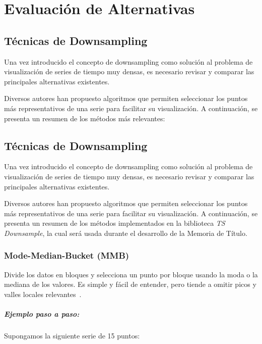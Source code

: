 \chapter{Evaluación de Alternativas}
\label{alternatives}

\section{Técnicas de Downsampling}

Una vez introducido el concepto de downsampling como solución al problema de visualización de series de tiempo muy densas, es necesario revisar y comparar las principales alternativas existentes.

Diversos autores han propuesto algoritmos que permiten seleccionar los puntos más representativos de una serie para facilitar su visualización. A continuación, se presenta un resumen de los métodos más relevantes:

\section{Técnicas de Downsampling}

Una vez introducido el concepto de downsampling como solución al problema de visualización de series de tiempo muy densas, es necesario revisar y comparar las principales alternativas existentes.

Diversos autores han propuesto algoritmos que permiten seleccionar los puntos más representativos de una serie para facilitar su visualización. A continuación, se presenta un resumen de los métodos implementados en la biblioteca \textit{TS Downsample}, la cual será usada durante el desarrollo de la Memoria de Título.

\subsection{Mode-Median-Bucket (MMB)} 
Divide los datos en bloques y selecciona un punto por bloque usando la moda o la mediana de los valores. Es simple y fácil de entender, pero tiende a omitir picos y valles locales relevantes~\cite{steinarsson2013downsampling}.

\paragraph{Ejemplo paso a paso:}

Supongamos la siguiente serie de 15 puntos:

